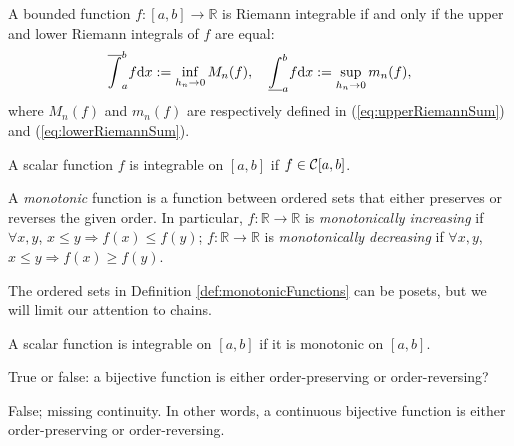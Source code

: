 \begin{thm}
  \label{thm:upperLowerRiemannIntegrals}
  A bounded function $f:[a,b]\rightarrow\mathbb{R}$
  is Riemann integrable if and only if
  the upper and lower Riemann integrals of $f$ are equal: 
  \begin{equation}
    \label{eq:upperLowerRiemannIntegrals}
    \overline{\int}_a^b f \mathrm{d} x :=
    \inf_{h_n\rightarrow 0} M_n(f), \quad
    \underline{\int}_a^b f \mathrm{d} x :=
    \sup_{h_n\rightarrow 0} m_n(f), 
  \end{equation}
  where $M_n(f)$ and $m_n(f)$ are respectively defined in
  (\ref{eq:upperRiemannSum}) and (\ref{eq:lowerRiemannSum}). 
\end{thm}

\begin{thm}
  A scalar function $f$ is integrable on $[a, b]$
   if $f\in {\cal C}[a,b]$.
\end{thm}

\begin{defn}
  \label{def:monotonicFunctions}
  A \emph{monotonic} function is a function between ordered sets
   that either preserves or reverses the given order.
  In particular,
   $f:\mathbb{R}\rightarrow\mathbb{R}$
   is \emph{monotonically increasing}
   if $\forall x,y$, $x \le y \Rightarrow f(x)\le f(y)$;
   $f:\mathbb{R}\rightarrow\mathbb{R}$
   is \emph{monotonically decreasing}
   if $\forall x,y$, $x \le y \Rightarrow f(x)\ge f(y)$.
\end{defn}

\begin{rem}
  The ordered sets in Definition \ref{def:monotonicFunctions}
  can be posets,
  but we will limit our attention to chains.
\end{rem}

\begin{thm}
  A scalar function is integrable on $[a, b]$
   if it is monotonic on $[a, b]$.
\end{thm}

\begin{exc}
  True or false:
   a bijective function is either order-preserving
    or order-reversing?
\end{exc}
\begin{solution}
  False; missing continuity.
  In other words,
   a continuous bijective function is either order-preserving
    or order-reversing.
\end{solution}


